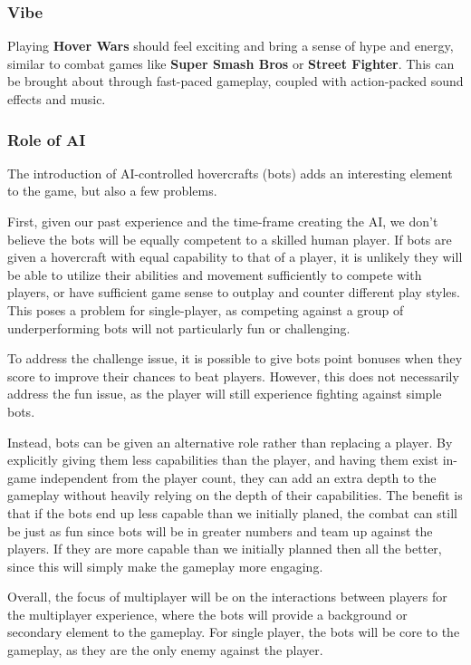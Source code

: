 \documentclass{article}
\newcommand{\namenobold}{Hover Wars}
\newcommand{\name}{\textbf{\namenobold}}
\theoremstyle{definition}
\begin{document}
\subsubsection{Vibe}

Playing \name{} should feel exciting and bring a sense of hype and energy,
similar to combat games like \textbf{Super Smash Bros} or \textbf{Street
Fighter}. This can be brought about through fast-paced gameplay, coupled with
action-packed sound effects and music.

\subsubsection{Role of AI}

The introduction of AI-controlled hovercrafts (bots) adds an interesting
element to the game, but also a few problems.

First, given our past experience and the time-frame creating the AI, we don't
believe the bots will be equally competent to a skilled human player. If bots
are given a hovercraft with equal capability to that of a player, it is
unlikely they will be able to utilize their abilities and movement sufficiently
to compete with players, or have sufficient game sense to outplay and counter
different play styles. This poses a problem for single-player, as competing
against a group of underperforming bots will not particularly fun or
challenging.

To address the challenge issue, it is possible to give bots point bonuses when
they score to improve their chances to beat players. However, this does not
necessarily address the fun issue, as the player will still experience fighting
against simple bots.

Instead, bots can be given an alternative role rather than replacing a player.
By explicitly giving them less capabilities than the player, and having them
exist in-game independent from the player count, they can add an extra depth to
the gameplay without heavily relying on the depth of their capabilities. The
benefit is that if the bots end up less capable than we initially planed, the
combat can still be just as fun since bots will be in greater numbers and team
up against the players. If they are more capable than we initially planned then
all the better, since this will simply make the gameplay more engaging.

Overall, the focus of multiplayer will be on the interactions between players
for the multiplayer experience, where the bots will provide a background or
secondary element to the gameplay. For single player, the bots will be core to
the gameplay, as they are the only enemy against the player.
\end{document}

